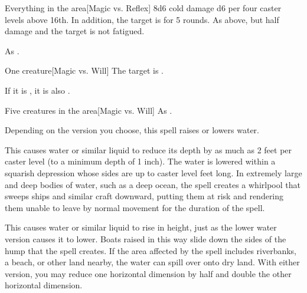 \begin{spelltarget}{Everything in the area}[Magic vs. Reflex]
    \spellsuccess 8d6 cold damage \add d6 per four caster levels above 16th. In addition, the target is \fatigued for 5 rounds.
    \spellfailure As above, but half damage and the target is not fatigued.
\end{spelltarget}
\spellnotes As .

\spellrng{\rngmed}
\spelldur{\durshort}
\begin{spelltarget}{One creature}[Magic vs. Will]
    \spellsuccess The target is \bewildered.

    If it is \bloodied, it is also \confused.
\end{spelltarget}

\spellrng{\rngmed}
\begin{spelltarget}{Five creatures in the area}[Magic vs. Will]
    \spellsuccess As .
\end{spelltarget}

\spelldur{\durmed \dismissable}
\spellline
\spelleffect Depending on the version you choose, this spell raises or lowers water.
\par {} This causes water or similar liquid to reduce its depth by as much as 2 feet per caster level (to a minimum depth of 1 inch). The water is lowered within a squarish depression whose sides are up to caster level  feet long. In extremely large and deep bodies of water, such as a deep ocean, the spell creates a whirlpool that sweeps ships and similar craft downward, putting them at risk and rendering them unable to leave by normal movement for the duration of the spell.
\par {} This causes water or similar liquid to rise in height, just as the lower water version causes it to lower. Boats raised in this way slide down the sides of the hump that the spell creates. If the area affected by the spell includes riverbanks, a beach, or other land nearby, the water can spill over onto dry land.
\spellnotes With either version, you may reduce one horizontal dimension by half and double the other horizontal dimension.

